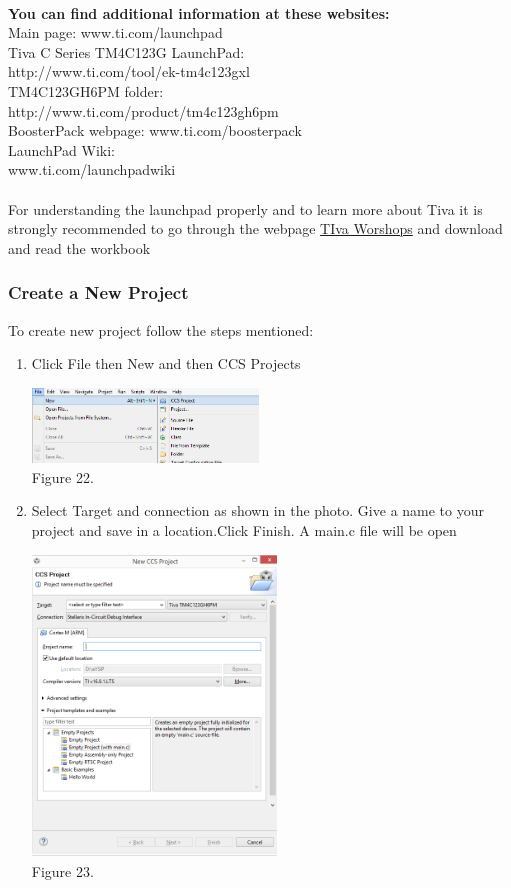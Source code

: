 \documentclass[a4paper,10pt,oneside]{article}
\begin{document}
				{\textbf{\\You can find additional information at these websites:}\\
				Main page: www.ti.com/launchpad\\
				Tiva C Series TM4C123G LaunchPad:\\ http://www.ti.com/tool/ek-tm4c123gxl\\
				TM4C123GH6PM folder:\\ http://www.ti.com/product/tm4c123gh6pm\\
				BoosterPack webpage: www.ti.com/boosterpack\\
				LaunchPad Wiki:\\ www.ti.com/launchpadwiki\\}	\\	
				{For understanding the launchpad properly and to learn more about Tiva it is strongly recommended to go through the webpage \href{http://processors.wiki.ti.com/index.php/Getting_Started_with_the_TIVA\%E2\%84\%A2_C_Series_TM4C123G_LaunchPad}{TIva Worshops} and download and read the workbook }
			\subsubsection{\textbf{Create a New Project}}
				To create new project follow the steps mentioned:
				\begin{enumerate}
					\item Click File then New and then CCS Projects \\
						\begin{center}
						\includegraphics[width=6cm, height=2cm]{Images/CreatingNewProject1}\\
						Figure 22.
						\end{center}
					\item Select Target and connection as shown in the photo. Give a name to your project and save in a location.Click Finish. A main.c file will be open\\
						\begin{center}
						\includegraphics[width=6.5cm, height=8cm]{Images/CreatingNewProject2}\\
						Figure 23.
						\end{center}
				\end{enumerate}
\end{document}
